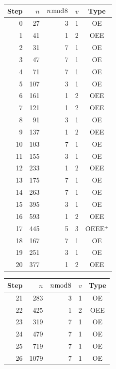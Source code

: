 \documentclass[11pt]{article}
\begin{document}
\begin{table}[h]
\centering
\small
\begin{minipage}[t]{0.48\textwidth}
\centering
\begin{tabular}{rrrrc}
\hline
Step & $n$ & $n{\bmod}8$ & $v$ & Type \\
\hline
0  & 27   & 3 & 1 & OE       \\
1  & 41   & 1 & 2 & OEE      \\
2  & 31   & 7 & 1 & OE       \\
3  & 47   & 7 & 1 & OE       \\
4  & 71   & 7 & 1 & OE       \\
5  & 107  & 3 & 1 & OE       \\
6  & 161  & 1 & 2 & OEE      \\
7  & 121  & 1 & 2 & OEE      \\
8  & 91   & 3 & 1 & OE       \\
9  & 137  & 1 & 2 & OEE      \\
10 & 103  & 7 & 1 & OE       \\
11 & 155  & 3 & 1 & OE       \\
12 & 233  & 1 & 2 & OEE      \\
13 & 175  & 7 & 1 & OE       \\
14 & 263  & 7 & 1 & OE       \\
15 & 395  & 3 & 1 & OE       \\
16 & 593  & 1 & 2 & OEE      \\
17 & 445  & 5 & 3 & OEEE$^+$ \\
18 & 167  & 7 & 1 & OE       \\
19 & 251  & 3 & 1 & OE       \\
20 & 377  & 1 & 2 & OEE      \\
\hline
\end{tabular}
\end{minipage}
\hfill
\begin{minipage}[t]{0.48\textwidth}
\centering
\begin{tabular}{rrrrc}
\hline
Step & $n$ & $n{\bmod}8$ & $v$ & Type \\
\hline
21 & 283  & 3 & 1 & OE       \\
22 & 425  & 1 & 2 & OEE      \\
23 & 319  & 7 & 1 & OE       \\
24 & 479  & 7 & 1 & OE       \\
25 & 719  & 7 & 1 & OE       \\
26 & 1079 & 7 & 1 & OE       \\

\end{tabular}
\end{minipage}
\end{table}
\end{document}
